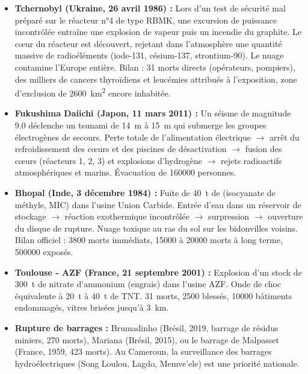\documentclass[11pt]{article}
\begin{document}
\begin{exemplebox}
\begin{itemize}
    \item \textbf{Tchernobyl (Ukraine, 26 avril 1986) :} Lors d'un test de sécurité mal préparé sur le réacteur n°4 de type RBMK, une excursion de puissance incontrôlée entraîne une explosion de vapeur puis un incendie du graphite. Le cœur du réacteur est découvert, rejetant dans l'atmosphère une quantité massive de radioéléments (iode-\num{131}, césium-\num{137}, strontium-\num{90}). Le nuage contamine l'Europe entière. Bilan : \num{31} morts directs (opérateurs, pompiers), des milliers de cancers thyroïdiens et leucémies attribués à l'exposition, zone d'exclusion de \SI{2600}{km^2} encore inhabitée.
    \item \textbf{Fukushima Daiichi (Japon, 11 mars 2011) :} Un séisme de magnitude \num{9,0} déclenche un tsunami de \SI{14}{\meter} à \SI{15}{\meter} qui submerge les groupes électrogènes de secours. Perte totale de l'alimentation électrique $\rightarrow$ arrêt du refroidissement des cœurs et des piscines de désactivation $\rightarrow$ fusion des cœurs (réacteurs 1, 2, 3) et explosions d'hydrogène $\rightarrow$ rejets radioactifs atmosphériques et marins. Évacuation de \num{160000} personnes.
    \item \textbf{Bhopal (Inde, 3 décembre 1984) :} Fuite de \SI{40}{\tonne} de  (isocyanate de méthyle, MIC) dans l'usine Union Carbide. Entrée d'eau dans un réservoir de stockage $\rightarrow$ réaction exothermique incontrôlée $\rightarrow$ surpression $\rightarrow$ ouverture du disque de rupture. Nuage toxique au ras du sol sur les bidonvilles voisins. Bilan officiel : \num{3800} morts immédiats, \num{15000} à \num{20000} morts à long terme, \num{500000} exposés.
    \item \textbf{Toulouse - AZF (France, 21 septembre 2001) :} Explosion d'un stock de \SI{300}{\tonne} de nitrate d'ammonium (engrais) dans l'usine AZF. Onde de choc équivalente à \SI{20}{\tonne} à \SI{40}{\tonne} de TNT. \num{31} morts, \num{2500} blessés, \num{10000} bâtiments endommagés, vitres brisées jusqu'à \SI{3}{\km}.
    \item \textbf{Rupture de barrages :} Brumadinho (Brésil, 2019, barrage de résidus miniers, \num{270} morts), Mariana (Brésil, 2015), ou le barrage de Malpasset (France, 1959, \num{423} morts). Au Cameroun, la surveillance des barrages hydroélectriques (Song Loulou, Lagdo, Memve'ele) est une priorité nationale.
\end{itemize}
\end{exemplebox}
\end{document}
